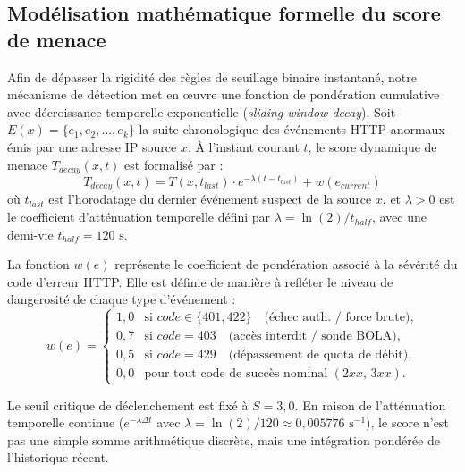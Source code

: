 \subsection{Modélisation mathématique formelle du score de menace}
Afin de dépasser la rigidité des règles de seuillage binaire instantané, notre mécanisme de détection met en œuvre une fonction de pondération cumulative avec décroissance temporelle exponentielle (\textit{sliding window decay}). Soit $E(x) = \{e_1, e_2, \dots, e_k\}$ la suite chronologique des événements HTTP anormaux émis par une adresse IP source $x$. À l'instant courant $t$, le score dynamique de menace $T_{decay}(x, t)$ est formalisé par :
\begin{equation}
T_{decay}(x, t) = T(x, t_{last}) \cdot e^{-\lambda (t - t_{last})} + w(e_{current})
\label{eq:threat_decay}
\end{equation}
où $t_{last}$ est l'horodatage du dernier événement suspect de la source $x$, et $\lambda > 0$ est le coefficient d'atténuation temporelle défini par $\lambda = \ln(2) / t_{half}$, avec une demi-vie $t_{half} = 120\text{ s}$.

La fonction $w(e)$ représente le coefficient de pondération associé à la sévérité du code d'erreur HTTP. Elle est définie de manière à refléter le niveau de dangerosité de chaque type d'événement :
\begin{equation}
w(e) = \left\{
\begin{array}{ll}
1{,}0 & \text{si } code \in \{401, 422\} \quad \text{(échec auth. / force brute),} \\[3pt]
0{,}7 & \text{si } code = 403 \quad \text{(accès interdit / sonde BOLA),} \\[3pt]
0{,}5 & \text{si } code = 429 \quad \text{(dépassement de quota de débit),} \\[3pt]
0{,}0 & \text{pour tout code de succès nominal } (2xx,\, 3xx).
\end{array}
\right.
\label{eq:threat_weights}
\end{equation}

Le seuil critique de déclenchement est fixé à $S = 3{,}0$. En raison de l'atténuation temporelle continue ($e^{-\lambda \Delta t}$ avec $\lambda = \ln(2)/120 \approx 0{,}005776\text{ s}^{-1}$), le score n'est pas une simple somme arithmétique discrète, mais une intégration pondérée de l'historique récent. 


